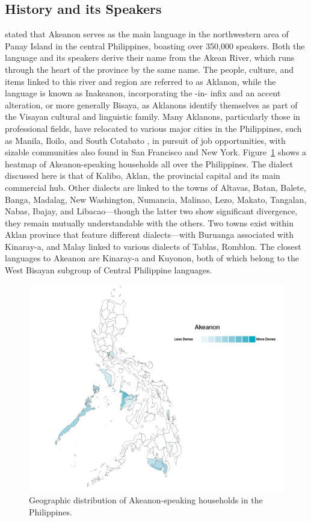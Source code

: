 \subsection{History and its Speakers}
 stated that Akeanon serves as the main language in the northwestern area of Panay Island in the central Philippines, boasting over 350,000 speakers. Both the language and its speakers derive their name from the Akean River, which runs through the heart of the province by the same name. The people, culture, and items linked to this river and region are referred to as Aklanon, while the language is known as Inakeanon, incorporating the -in- infix and an accent alteration, or more generally Bisaya, as Aklanons identify themselves as part of the Visayan cultural and linguistic family. Many Aklanons, particularly those in professional fields, have relocated to various major cities in the Philippines, such as Manila, Iloilo, and South Cotabato \cite{AkeanonMap}, in pursuit of job opportunities, with sizable communities also found in San Francisco and New York. Figure~\ref{fig:akeanonmap} shows a heatmap of Akeanon-speaking households all over the Philippines. The dialect discussed here is that of Kalibo, Aklan, the provincial capital and its main commercial hub. Other dialects are linked to the towns of Altavas, Batan, Balete, Banga, Madalag, New Washington, Numancia, Malinao, Lezo, Makato, Tangalan, Nabas, Ibajay, and Libacao—though the latter two show significant divergence, they remain mutually understandable with the others. Two towns exist within Aklan province that feature different dialects—with Buruanga associated with Kinaray-a, and Malay linked to various dialects of Tablas, Romblon. The closest languages to Akeanon are Kinaray-a and Kuyonon, both of which belong to the West Bisayan subgroup of Central Philippine languages.

\begin{figure}[h!]
	\centering
	\includegraphics[width=\textwidth]{./figures/akeanon-map.png}
	\caption{Geographic distribution of Akeanon-speaking households in the Philippines.}
	\label{fig:akeanonmap}
\end{figure}

